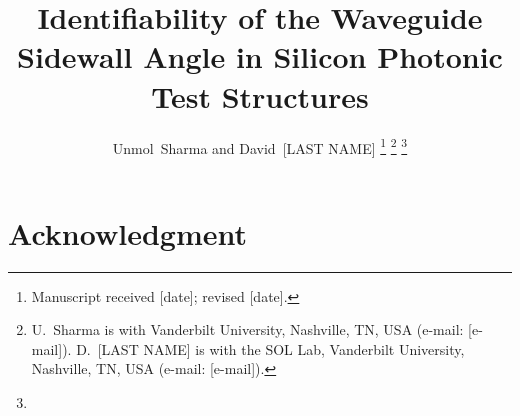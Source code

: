 \documentclass[journal]{IEEEtran}
\newcommand{\todo}[1]{}
\begin{document}
\title{Identifiability of the Waveguide Sidewall Angle in Silicon Photonic Test Structures}

\author{\todo{author names: Unmol Sharma and David [co-author surname]}Unmol~Sharma and David~[LAST NAME]%
\thanks{\todo{manuscript dates}Manuscript received [date]; revised [date].}%
\thanks{\todo{affiliations and e-mails of both authors}U.~Sharma is with Vanderbilt University, Nashville, TN, USA (e-mail: [e-mail]).
D.~[LAST NAME] is with the SOL Lab, Vanderbilt University, Nashville, TN, USA (e-mail: [e-mail]).}%
\thanks{\todo{corresponding author}}}

\maketitle










\section*{Acknowledgment}
\todo{acknowledgments: funding, lab, people}



\end{document}
